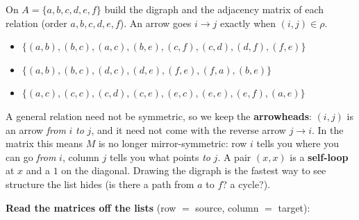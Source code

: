 \documentclass[11pt,a4paper]{article}
\begin{document}
\begin{problembox}[2.2]
On $A=\{a,b,c,d,e,f\}$ build the digraph and the adjacency matrix of each relation
(order $a,b,c,d,e,f$). An arrow goes $i\to j$ exactly when $(i,j)\in\rho$.
\begin{itemize}[leftmargin=1.6em,nosep]
\item[a)] $\{(a,b),(b,c),(a,c),(b,e),(c,f),(c,d),(d,f),(f,e)\}$
\item[b)] $\{(a,b),(b,c),(d,c),(d,e),(f,e),(f,a),(b,e)\}$
\item[c)] $\{(a,c),(c,c),(c,d),(c,e),(e,c),(e,e),(e,f),(a,e)\}$
\end{itemize}
\end{problembox}

\begin{ideabox}
A general relation need not be symmetric, so we keep the \textbf{arrowheads}: $(i,j)$ is an arrow
\emph{from} $i$ \emph{to} $j$, and it need not come with the reverse arrow $j\to i$. In the matrix
this means $M$ is no longer mirror-symmetric: row $i$ tells you where you can go \emph{from} $i$,
column $j$ tells you what points \emph{to} $j$. A pair $(x,x)$ is a \textbf{self-loop} at $x$ and a
$1$ on the diagonal. Drawing the digraph is the fastest way to see structure the list hides
(\textquotedbl{}is there a path from $a$ to $f$? a cycle?\textquotedbl{}).
\end{ideabox}

\textbf{Read the matrices off the lists} (row $=$ source, column $=$ target):

\begin{center}
\end{center}
\end{document}
